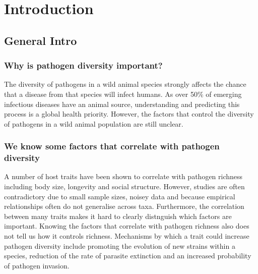 
\clearpage
\section{Introduction}





\subsection{General Intro}


\subsubsection{Why is pathogen diversity important?}

The diversity of pathogens in a wild animal species strongly affects the chance that a disease from that species will infect humans.
As over 50\% of emerging infectious diseases have an animal source\cite{jones2008global}, understanding and predicting this process is a global health priority.
However, the factors that control the diversity of pathogens in a wild animal population are still unclear.


\subsubsection{We know some factors that correlate with pathogen diversity}
A number of host traits have been shown to correlate with pathogen richness including body size\cite{}, longevity\cite{} and social structure\cite{}.
However, studies are often contradictory due to small sample sizes, noisey data and because empirical relationships often do not generalise across taxa.
Furthermore, the correlation between many traits makes it hard to clearly distnguish which factors are important.
Knowing the factors that correlate with pathogen richness also does not tell us how it controls richness. 
Mechanisms by which a trait could increase pathogen diversity include promoting the evolution of new strains within a species, reduction of the rate of parasite extinction and an increased probability of pathogen invasion.



